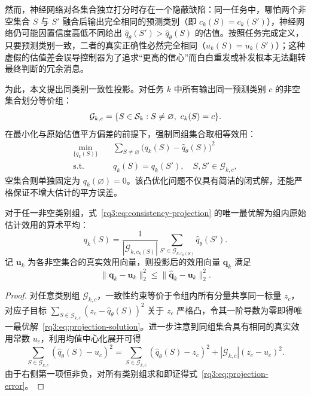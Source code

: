 然而，神经网络对各集合独立打分时存在一个隐蔽缺陷：同一任务中，哪怕两个非空集合 $S$ 与 $S'$ 融合后输出完全相同的预测类别（即 $c_k(S)=c_k(S')$），神经网络仍可能因置信度高低不同给出 $\hat q_\theta(S')>\hat q_\theta(S)$ 的估值。按照任务完成定义，只要预测类别一致，二者的真实正确性必然完全相同（$u_k(S)=u_k(S')$）；这种虚假的估值差会误导控制器为了追求“更高的信心”而白白重发或补发根本无法翻转最终判断的冗余消息。

为此，本文提出同类别一致性投影。对任务 $k$ 中所有输出同一预测类别 $c$ 的非空集合划分等价组：
\begin{equation}
  \mathcal G_{k,c}=\{S\in\mathcal{S}_k:S\ne\varnothing,\ c_k(S)=c\}.
  \label{rq3:eq:class-groups}
\end{equation}
在最小化与原始估值平方偏差的前提下，强制同组集合取相等效用：
\begin{equation}
  \begin{aligned}
    \min_{\{q_k(S)\}}\quad &\sum_{S\ne\varnothing}
       \bigl(q_k(S)-\hat q_\theta(S)\bigr)^2\\
    \mathrm{s.t.}\quad &q_k(S)=q_k(S'),\quad S,S'\in\mathcal G_{k,c},
  \end{aligned}
  \label{rq3:eq:consistency-projection}
\end{equation}
空集合则单独固定为 $q_k(\varnothing)=0$。该凸优化问题不仅具有简洁的闭式解，还能严格保证不增大估计的平方误差。

\begin{proposition}[一致性投影的闭式解与误差性质]
\label{rq3:prop:projection}
对于任一非空类别组，式~\eqref{rq3:eq:consistency-projection} 的唯一最优解为组内原始估计效用的算术平均：
\begin{equation}
  q_k(S)=\frac{1}{|\mathcal G_{k,c_k(S)}|}
    \sum_{S'\in\mathcal G_{k,c_k(S)}}\hat q_\theta(S').
  \label{rq3:eq:projection-solution}
\end{equation}
记 $\bm u_k$ 为各非空集合的真实效用向量，则投影后的效用向量 $\bm q_k$ 满足
\begin{equation}
  \|\bm q_k-\bm u_k\|_2^2
  \le\|\widehat{\bm q}_k-\bm u_k\|_2^2.
  \label{rq3:eq:projection-error}
\end{equation}
\end{proposition}

\begin{proof}
对任意类别组 $\mathcal G_{k,c}$，一致性约束等价于令组内所有分量共享同一标量 $z_c$，对应子目标 $\sum_{S\in\mathcal G_{k,c}}(z_c-\hat q_\theta(S))^2$ 关于 $z_c$ 严格凸，令其一阶导数为零即得唯一最优解~\eqref{rq3:eq:projection-solution}。进一步注意到同组集合具有相同的真实效用常数 $u_c$，利用均值中心化展开可得
\begin{equation}
  \sum_{S\in\mathcal G_{k,c}}(\hat q_\theta(S)-u_c)^2
  =\sum_{S\in\mathcal G_{k,c}}(\hat q_\theta(S)-z_c)^2
   +|\mathcal G_{k,c}|(z_c-u_c)^2.
  \label{rq3:eq:projection-decomposition}
\end{equation}
由于右侧第一项恒非负，对所有类别组求和即证得式~\eqref{rq3:eq:projection-error}。
\end{proof}

